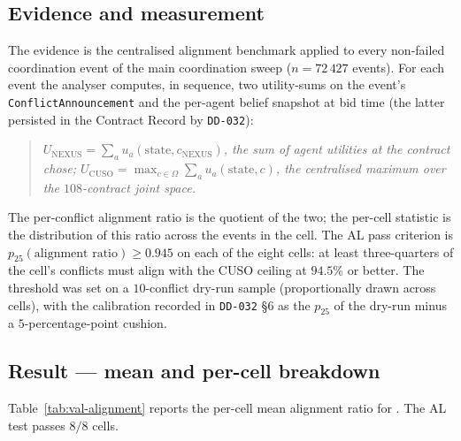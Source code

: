 \subsection*{Evidence and measurement}

The evidence is the centralised alignment benchmark applied to every
non-failed coordination event of the main coordination sweep
($n = 72\,427$ events). For each event the analyser computes, in
sequence, two utility-sums on the event's
\texttt{ConflictAnnouncement} and the per-agent belief snapshot at
bid time (the latter persisted in the Contract Record by
\texttt{DD-032}):

\begin{quote}
\itshape
$U_{\textrm{NEXUS}} = \sum_a u_a(\text{state}, c_{\textrm{NEXUS}})$,
the sum of agent utilities at the contract \NEXUS{} chose;\;
$U_{\textrm{CUSO}} = \max_{c \in \Omega} \sum_a u_a(\text{state}, c)$,
the centralised maximum over the $108$-contract joint space.
\end{quote}

The per-conflict alignment ratio is the quotient of the two; the
per-cell statistic is the distribution of this ratio across the
events in the cell. The AL pass criterion is
$p_{25}(\text{alignment ratio}) \ge 0.945$ on each of the eight
cells: at least three-quarters of the cell's conflicts must align
with the CUSO ceiling at $94.5\%$ or better. The threshold was set
on a $10$-conflict dry-run sample (proportionally drawn across
cells), with the calibration recorded in \texttt{DD-032} §6 as the
$p_{25}$ of the dry-run minus a $5$-percentage-point cushion.

\subsection*{Result --- mean and per-cell breakdown}

Table~\ref{tab:val-alignment} reports the per-cell mean alignment
ratio for \NEXUS{}. The AL test passes $8/8$ cells.

